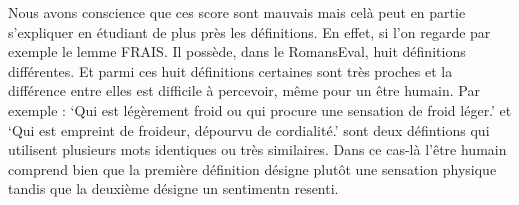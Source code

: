 Nous avons conscience que ces score sont mauvais mais celà peut en partie 
s'expliquer en étudiant de plus près les définitions. En effet, si l'on regarde 
par exemple le lemme FRAIS. Il possède, dans le RomansEval, huit définitions 
différentes. Et parmi ces huit définitions certaines sont très proches et la 
différence entre elles est difficile à percevoir, même pour un être humain. Par 
exemple : `Qui est légèrement froid ou qui procure une sensation de froid 
léger.' et `Qui est empreint de froideur, dépourvu de cordialité.' sont deux 
défintions qui utilisent plusieurs mots identiques ou très similaires. Dans ce 
cas-là l'être humain comprend bien que la première définition désigne plutôt 
une sensation physique tandis que la deuxième désigne un sentimentn resenti.


